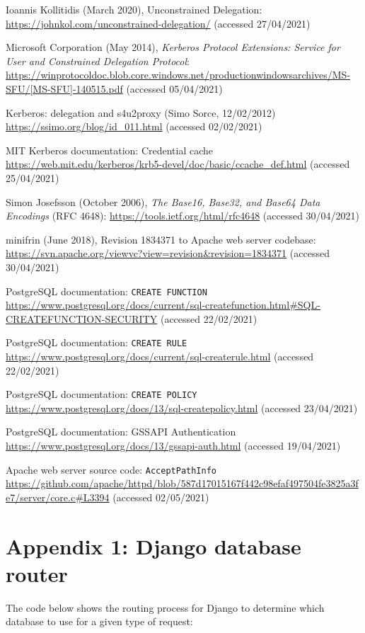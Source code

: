 \documentclass{article}
\begin{document}
\begin{thebibliography}{9}
 Ioannis Kollitidis (March 2020), Unconstrained Delegation: \url{https://johnkol.com/unconstrained-delegation/} (accessed 27/04/2021)

 Microsoft Corporation (May 2014), \textit{Kerberos Protocol Extensions: Service for User and Constrained Delegation Protocol}: \url{https://winprotocoldoc.blob.core.windows.net/productionwindowsarchives/MS-SFU/[MS-SFU]-140515.pdf} (accessed 05/04/2021)

 Kerberos: delegation and s4u2proxy (Simo Sorce, 12/02/2012) \url{https://ssimo.org/blog/id_011.html} (accessed 02/02/2021)

 MIT Kerberos documentation: Credential cache \url{https://web.mit.edu/kerberos/krb5-devel/doc/basic/ccache_def.html} (accessed 25/04/2021)

 Simon Josefsson (October 2006), \textit{The Base16, Base32, and Base64 Data Encodings} (RFC 4648): \url{https://tools.ietf.org/html/rfc4648} (accessed 30/04/2021)

 minifrin (June 2018), Revision 1834371 to Apache web server codebase: \url{https://svn.apache.org/viewvc?view=revision&revision=1834371} (accessed 30/04/2021)

 PostgreSQL documentation: \texttt{CREATE FUNCTION} \url{https://www.postgresql.org/docs/current/sql-createfunction.html#SQL-CREATEFUNCTION-SECURITY} (accessed 22/02/2021)

 PostgreSQL documentation: \texttt{CREATE RULE} \url{https://www.postgresql.org/docs/current/sql-createrule.html} (accessed 22/02/2021)

 PostgreSQL documentation: \texttt{CREATE POLICY} \url{https://www.postgresql.org/docs/13/sql-createpolicy.html} (accessed 23/04/2021)

 PostgreSQL documentation: GSSAPI Authentication \url{https://www.postgresql.org/docs/13/gssapi-auth.html} (accessed 19/04/2021)

 Apache web server source code: \texttt{AcceptPathInfo} \url{https://github.com/apache/httpd/blob/587d17015167f442c98efaf497504fe3825a3fe7/server/core.c#L3394} (accessed 02/05/2021)
\end{thebibliography}

\section*{Appendix 1: Django database router}
\label{sec:appendix1}
The code below shows the routing process for Django to determine which database to use for a given type of request:
\end{document}
